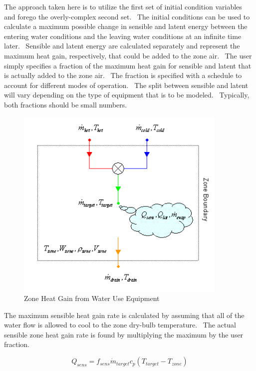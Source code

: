 The approach taken here is to utilize the first set of initial condition variables and forego the overly-complex second set.~ The initial conditions can be used to calculate a maximum possible change in sensible and latent energy between the entering water conditions and the leaving water conditions at an infinite time later.~ Sensible and latent energy are calculated separately and represent the maximum heat gain, respectively, that could be added to the zone air.~ The user simply specifies a fraction of the maximum heat gain for sensible and latent that is actually added to the zone air.~ The fraction is specified with a schedule to account for different modes of operation.~ The split between sensible and latent will vary depending on the type of equipment that is to be modeled.~ Typically, both fractions should be small numbers.

\begin{figure}[hbtp] %
\centering
\includegraphics[width=0.9\textwidth, height=0.9\textheight, keepaspectratio=true]{media/image6962.png}
\caption{  Zone Heat Gain from Water Use Equipment \protect \label{fig:zone-heat-gain-from-water-use-equipment}}
\end{figure}

The maximum sensible heat gain rate is calculated by assuming that all of the water flow is allowed to cool to the zone dry-bulb temperature.~ The actual sensible zone heat gain rate is found by multiplying the maximum by the user fraction.

\begin{equation}
{Q_{sens}} = {f_{sens}}{\dot m_{target}}{c_p}\left( {{T_{target}} - {T_{zone}}} \right)
\end{equation}

